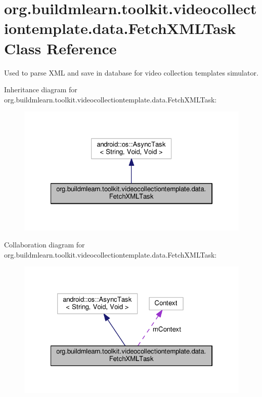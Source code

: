 \hypertarget{classorg_1_1buildmlearn_1_1toolkit_1_1videocollectiontemplate_1_1data_1_1FetchXMLTask}{}\section{org.\+buildmlearn.\+toolkit.\+videocollectiontemplate.\+data.\+Fetch\+X\+M\+L\+Task Class Reference}
\label{classorg_1_1buildmlearn_1_1toolkit_1_1videocollectiontemplate_1_1data_1_1FetchXMLTask}


Used to parse X\+ML and save in database for video collection template\textquotesingle{}s simulator.  




Inheritance diagram for org.\+buildmlearn.\+toolkit.\+videocollectiontemplate.\+data.\+Fetch\+X\+M\+L\+Task\+:
\nopagebreak
\begin{figure}[H]
\begin{center}
\leavevmode
\includegraphics[width=322pt]{classorg_1_1buildmlearn_1_1toolkit_1_1videocollectiontemplate_1_1data_1_1FetchXMLTask__inherit__graph}
\end{center}
\end{figure}


Collaboration diagram for org.\+buildmlearn.\+toolkit.\+videocollectiontemplate.\+data.\+Fetch\+X\+M\+L\+Task\+:
\nopagebreak
\begin{figure}[H]
\begin{center}
\leavevmode
\includegraphics[width=322pt]{classorg_1_1buildmlearn_1_1toolkit_1_1videocollectiontemplate_1_1data_1_1FetchXMLTask__coll__graph}
\end{center}
\end{figure}
